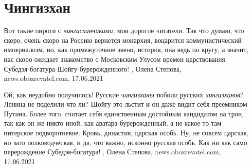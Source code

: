  
 
 
 
 
\chapter{Чингизхан}

Вот такие пироги с \emph{чингисханчиками}, мои дорогие читатели. Так что думаю,
что скоро, очень скоро на Россию вернется монархия, воцарится коммунистический
империализм, но, как промежуточное звено, история, она ведь по кругу, а значит,
нас скоро ожидает знакомство с Московским Улусом времен царствования
Субедэя-богатура-Шойгу-бурерожденного!
, 
Олена Степова, news.obozrevatel.com, 17.06.2021

Ой, как неудобно получилось! Русские \emph{чингизханы} побили русских
\emph{чингизханов}? Ленина не поделили что ли?  Шойгу это льстит и он даже
видит себя преемником Путина. Более того, считает себя единственным достойным
кандидатом на трон, так как он же никто иной, как аватара-бурерожденный, а не
какое-то там питерское подворотневое. Кровь, династия, царская особь. Ну, не
совсем царская, но зато полководческая, и да, что важно, исконно русская особь.
Как ни как само перерождение Субедэя-богатура!
, 
Олена Степова, news.obozrevatel.com, 17.06.2021

